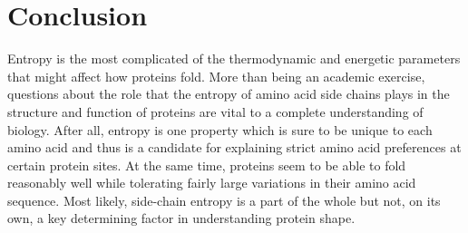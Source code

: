 \section*{Conclusion}
\label{sec:conclusion}
Entropy is the most complicated of the thermodynamic and energetic parameters that might affect how proteins fold. More than being an academic exercise, questions about the role that the entropy of amino acid side chains plays in the structure and function of proteins are vital to a complete understanding of biology. After all, entropy is one property which is sure to be unique to each amino acid and thus is a candidate for explaining strict amino acid preferences at certain protein sites. At the same time, proteins seem to be able to fold reasonably well while tolerating fairly large variations in their amino acid sequence. Most likely, side-chain entropy is a part of the whole but not, on its own, a key determining factor in understanding protein shape.